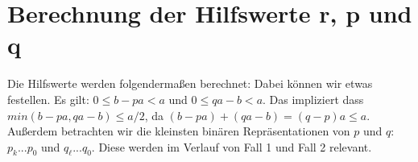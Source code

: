 \section{Berechnung der Hilfswerte r, p und q} \label{helper}
Die Hilfswerte werden folgendermaßen berechnet:
Dabei können wir etwas festellen. Es gilt: $0 \leq b-pa < a $ und $ 0 \leq qa - b < a $. 
Das impliziert dass $min(b-pa, qa-b) \leq a/2$, da $(b-pa)+(qa-b)=(q-p)a \leq a$. 
Außerdem betrachten wir die kleinsten binären Repräsentationen von $p$ und $q$: $p_k...p_0$ und $q_\ell...q_0$. Diese werden im Verlauf von Fall 1 und Fall 2 relevant.